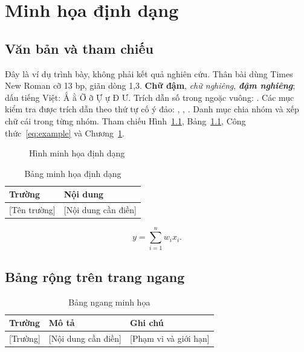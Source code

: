 \documentclass{template/ctu-report}
\begin{document}
\tableofcontents
\listoftables
\listoffigures
\chapter{Minh họa định dạng}\label{chap:example}
\section{Văn bản và tham chiếu}
Đây là ví dụ trình bày, không phải kết quả nghiên cứu.
Thân bài dùng Times New Roman cỡ 13 bp, giãn dòng 1,3.
\textbf{Chữ đậm}, \textit{chữ nghiêng}, \textbf{\textit{đậm nghiêng}};
dấu tiếng Việt: Ắ ằ Ỡ ỡ Ự ự Đ Ư.
Trích dẫn số trong ngoặc vuông: \citep{example-reference}.
Các mục kiểm tra được trích dẫn theo thứ tự cố ý đảo:
\citep{example-book-z}, \citep{example-book-a}, \citep{example-legal}.
Danh mục chia nhóm và xếp chữ cái trong từng nhóm.
Tham chiếu Hình~\ref{fig:example}, Bảng~\ref{tab:example},
Công thức~\eqref{eq:example} và Chương~\ref{chap:example}.
\begin{figure}[htbp]
  \centering
  \caption{Hình minh họa định dạng}\label{fig:example}
\end{figure}
\begingroup\small
\begin{table}[htbp]
  \centering
  \caption{Bảng minh họa định dạng}\label{tab:example}
  \begin{tabularx}{.85\textwidth}{lX}
    \toprule Trường & Nội dung \\
    \midrule
    {}[Tên trường] & [Nội dung cần điền] \\
    \bottomrule
  \end{tabularx}
\end{table}
\endgroup
\begin{equation}\label{eq:example}
  y = \sum_{i=1}^{n} w_i x_i.
\end{equation}
\clearpage
\begin{landscape}
\section{Bảng rộng trên trang ngang}
\begin{table}[htbp]
\centering
\caption{Bảng ngang minh họa}\label{tab:landscape}
\begin{tabularx}{\linewidth}{lXX}
\toprule Trường & Mô tả & Ghi chú \\
\midrule {}[Trường] & [Nội dung cần điền] & [Phạm vi và giới hạn] \\
\bottomrule
\end{tabularx}
\end{table}
\end{landscape}
\PrintReportBibliography
\end{document}
